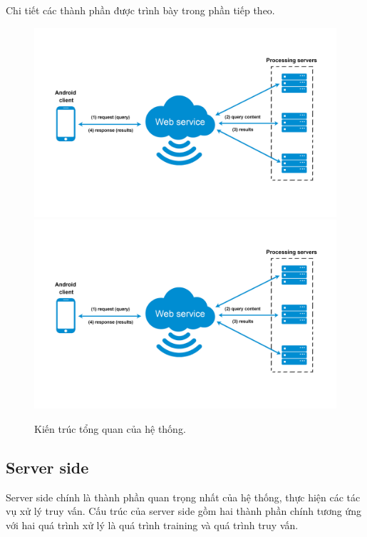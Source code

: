 Chi tiết các thành phần được trình bày trong phần tiếp theo.

\begin{figure}[!htbp]
  \begin{center}
    \leavevmode
    \ifpdf
      \includegraphics[scale=0.14]{architecture}
    \else
      \includegraphics[scale=0.14]{architecture}
    \fi
    \caption[Kiến trúc tổng quan của hệ thống]{Kiến trúc tổng quan của hệ thống.}
    \label{FigArchitecture}
  \end{center}
\end{figure}

\subsection{Server side}
Server side chính là thành phần quan trọng nhất của hệ thống, thực hiện các tác vụ xử lý truy vấn. Cấu trúc của server side gồm hai thành phần chính tương ứng với hai quá trình xử lý là quá trình training và quá trình truy vấn.

